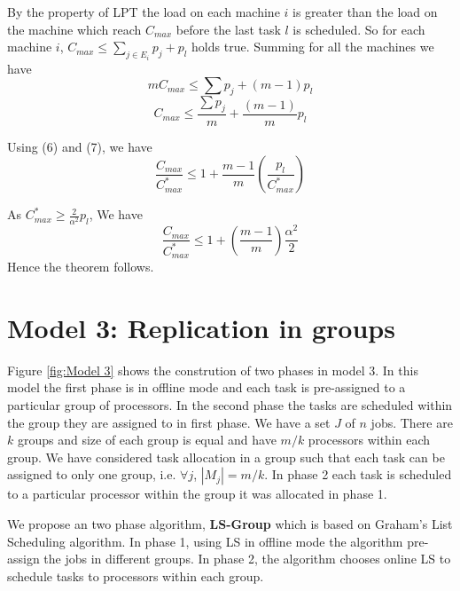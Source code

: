 \documentclass[10pt, conference, compsocconf]{IEEEtran}
\begin{document}
By the property of LPT the load on each machine $i$ is greater than the load on the machine which reach $C_{max}$ before the last task $l$ is scheduled. So for each machine $i$, $C_{max} \leq  \sum_{j \in E_i}^{}{p_j} + p_l$ holds true.  Summing for all the machines we have
\begin{equation}\nonumber 
mC_{max} \leq  \sum {p_j} + (m-1)p_l
\end{equation}
\begin{equation}
C_{max} \leq  \frac{\sum {p_j}}{m} + \frac{(m-1)}{m}p_l
\end{equation}

Using (6) and (7), we have
\begin{equation}\nonumber
\frac{C_{max}}{C_{max}^{*}} \leq 1 + {\frac{m-1}{m}}\left(\frac{p_l}{C_{max}^{*}}\right)
\end{equation}

As $C_{max}^{*} \geq {\frac{2}{\alpha^{2}}} p_l $, We have 
\begin{equation}\nonumber
\frac{C_{max}}{C_{max}^{*}} \leq 1 + \left(\frac{m-1}{m}\right)\frac{\alpha^{2}}{2}
\end{equation}
Hence the theorem follows.   \\                            

\section{Model 3: Replication in groups}
Figure \ref{fig:Model 3} shows the constrution of two phases in model 3.  In this model the first phase is in offline mode and each task is pre-assigned to a particular  group of processors. In the second phase the tasks are scheduled  within the group they are assigned to in first phase.   We have a set $J$ of $ n$ jobs.  There are $k$ groups and size of each group is equal and have $m/k$ processors within each group.  We have considered task allocation in a group such that each task can be assigned to only one group, i.e. $\forall j$, $|M_j|= m/k$.  In phase 2  each task is scheduled to a particular processor within the group it was allocated in phase 1. 

 We propose an two phase algorithm, \textbf{LS-Group} which is based on Graham’s List Scheduling algorithm. In phase 1, using LS in offline mode the algorithm pre-assign the jobs in different groups. In phase 2, the algorithm chooses online LS to schedule tasks to processors within each group.\\
\end{document}
